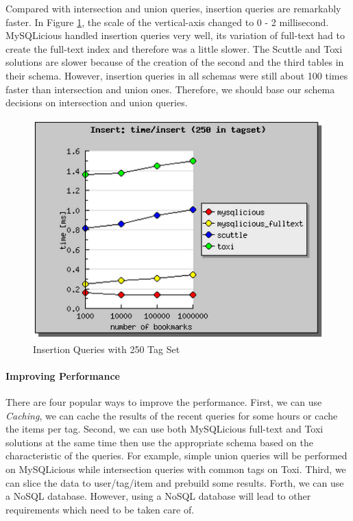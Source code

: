 Compared with intersection and union queries, insertion queries are remarkably faster. In Figure \ref{fg:insert250}, the scale of the vertical-axis changed to 0 - 2 millisecond. MySQLicious handled insertion queries very well, its variation of full-text had to create the full-text index and therefore was a little slower. The Scuttle and Toxi solutions are slower because of the creation of the second and the third tables in their schema. However, insertion queries in all schemas were still about 100 times faster than intersection and union ones. Therefore, we should base our schema decisions on intersection and union queries. 

\begin{figure}[!h]
\begin{centering}
\includegraphics[scale=0.8]{pics/insert250}
\caption{Insertion Queries with 250 Tag Set}\label{fg:insert250}
\end{centering}
\end{figure}

\paragraph{Improving Performance}
There are four popular ways to improve the performance. First, we can use \textit{Caching}, we can cache the results of the recent queries for some hours or cache the items per tag. Second, we can use both MySQLicious full-text and Toxi solutions at the same time then use the appropriate schema based on the characteristic of the queries. For example, simple union queries will be performed on MySQLicious while intersection queries with common tags on Toxi. Third, we can slice the data to user/tag/item and prebuild some results. Forth, we can use a NoSQL database. However, using a NoSQL database will lead to other requirements which need to be taken care of.

